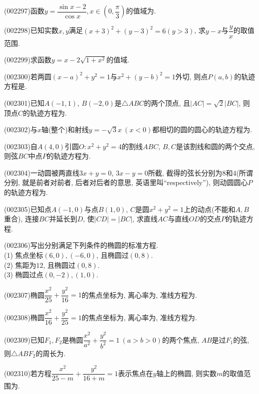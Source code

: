 \item (002297)函数$y=\dfrac{\sin x-2}{\cos x},x\in(0,\dfrac{\pi}{3})$的值域为.
\item (002298)已知实数$x,y$满足${{(x+3)}^{2}}+{{(y-3)}^{2}}=6(y>3)$, 求$y-x$与$\dfrac{y}{x}$的取值范围.
\item (002299)求函数$y=x-2\sqrt{1+x^2}$的值域.
\item (002300)若两圆$(x-a)^2+y^2=1$与$x^2+(y-b)^2=1$外切, 则点$P(a,b)$的轨迹方程是.
\item (002301)已知$A(-1,1)$, $B(-2,0)$是$\triangle ABC$的两个顶点, 且$|AC|=\sqrt{2}|BC|$,
则顶点$C$的轨迹方程为.
\item (002302)与$x$轴(整个)和射线$y=-\sqrt{3}x\ (x<0)$都相切的圆的圆心的轨迹方程为.
\item (002303)自$A(4,0)$引圆$O:x^2+y^2=4$的割线$ABC$, $B,C$是该割线和圆的两个交点,
则弦$BC$中点$P$的轨迹方程为.
\item (002304)一动圆被两直线$3x+y=0$, $3x-y=0$所截, 截得的弦长分别为$8$和$4$(所谓分别, 就是前者对前者, 后者对后者的意思, 英语里叫``{\textrm respectively}''), 则动圆圆心$P$的轨迹方程为.
\item (002305)已知点$A(-1,0)$与点$B(1,0)$, $C$是圆$x^2+y^2=1$上的动点(不能和$A,B$重合), 连接$BC$并延长到$D$, 使$|CD|=|BC|$, 求直线$AC$与直线$OD$的交点$P$的轨迹方程.
\item (002306)写出分别满足下列条件的椭圆的标准方程.\\ 
(1) 焦点坐标$(6,0),(-6,0)$, 且椭圆过$(0,8)$.\\ 
(2) 焦距为$12$, 且椭圆过$(0,8)$.\\ 
(3) 椭圆过点$(0,-2),(1,0)$.
\item (002307)椭圆$\dfrac{x^2}{25}+\dfrac{y^2}{16}=1$的焦点坐标为, 离心率为, 准线方程为.
\item (002308)椭圆$\dfrac{x^2}{16}+\dfrac{y^2}{25}=1$的焦点坐标为, 离心率为, 准线方程为.
\item (002309)已知$F_1,F_2$是椭圆$\dfrac{x^2}{a^2}+\dfrac{y^2}{b^2}=1 \ (a>b>0)$的两个焦点, $AB$是过$F_1$的弦, 则$\triangle ABF_2$的周长为.
\item (002310)若方程$\dfrac{x^2}{25-m}+\dfrac{y^2}{16+m}=1$表示焦点在$y$轴上的椭圆, 则实数$m$的取值范围为.
